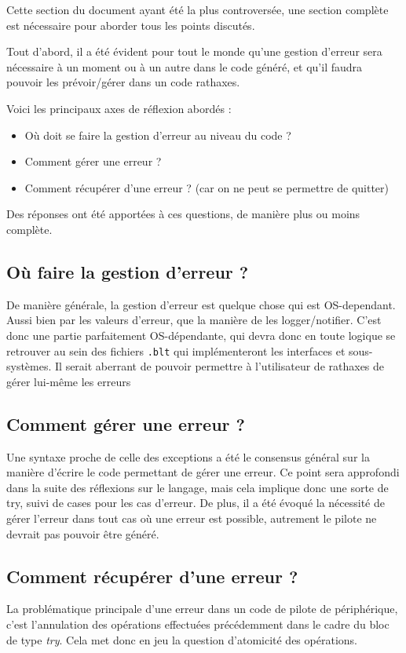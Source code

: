 \documentclass{rtxreport}
\begin{document}
Cette section du document ayant été la plus controversée, une section complète
est nécessaire pour aborder tous les points discutés.

Tout d'abord, il a été évident pour tout le monde qu'une gestion d'erreur sera
nécessaire à un moment ou à un autre dans le code généré, et qu'il faudra
pouvoir les prévoir/gérer dans un code rathaxes.

Voici les principaux axes de réflexion abordés :
\begin{itemize}
\item Où doit se faire la gestion d'erreur au niveau du code ?
\item Comment gérer une erreur ?
\item Comment récupérer d'une erreur ? (car on ne peut se permettre de quitter)
\end{itemize}

Des réponses ont été apportées à ces questions, de manière plus ou moins
complète.

\subsection{Où faire la gestion d'erreur ?}
De manière générale, la gestion d'erreur est quelque chose qui est OS-dependant.
Aussi bien par les valeurs d'erreur, que la manière de les logger/notifier.
C'est donc une partie parfaitement OS-dépendante, qui devra donc en toute
logique se retrouver au sein des fichiers \texttt{.blt} qui implémenteront les
interfaces et sous-systèmes. Il serait aberrant de pouvoir permettre à
l'utilisateur de rathaxes de gérer lui-même les erreurs 

\subsection{Comment gérer une erreur ?}
Une syntaxe proche de celle des exceptions a été le consensus général sur la
manière d'écrire le code permettant de gérer une erreur. Ce point sera
approfondi dans la suite des réflexions sur le langage, mais cela implique donc
une sorte de try, suivi de cases pour les cas d'erreur.
De plus, il a été évoqué la nécessité de gérer l'erreur dans tout cas où une
erreur est possible, autrement le pilote ne devrait pas pouvoir être généré.

\subsection{Comment récupérer d'une erreur ?}
La problématique principale d'une erreur dans un code de pilote de périphérique,
c'est l'annulation des opérations effectuées précédemment dans le cadre du bloc
de type \emph{try}. Cela met donc en jeu la question d'atomicité des opérations.
\end{document}
